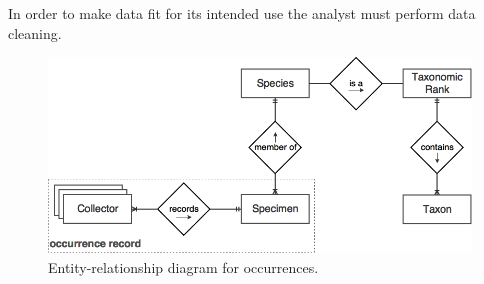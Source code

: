 









In order to make data fit for its intended use the analyst must perform data cleaning.








\begin{figure}[h!]
  	\centering
    \includegraphics[width=0.8\linewidth]{figures/er_occurrence.png}
    \caption{Entity-relationship diagram for occurrences.}
    \label{fig:er_occurrences}
\end{figure}


